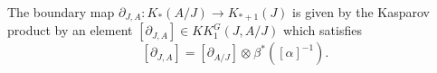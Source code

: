 \begin{prop}
The boundary map $\partial_{J,A} : K_*(A/J)\rightarrow K_{*+1}(J)$ is given by the Kasparov product by an element $[\partial_{J,A}]\in KK^G_1(J,A/J)$ which satisfies 
\[[\partial_{J,A}] = [\partial_{A/J}]\otimes_{} \beta^*([\alpha]^{-1}).\]
\end{prop}








































